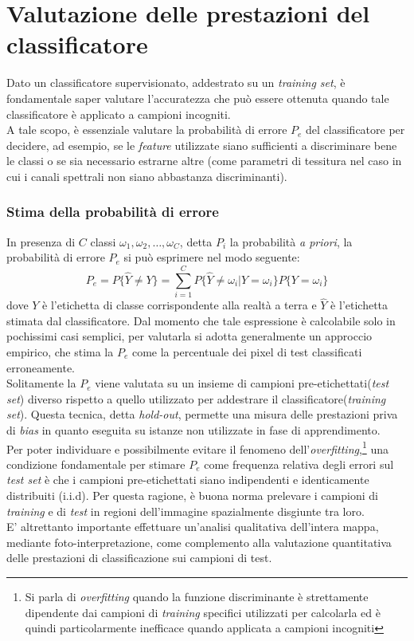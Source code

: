 
\chapter{Valutazione delle prestazioni del classificatore}
\label{cap:prestazioni}

Dato un classificatore supervisionato, addestrato su un \emph{training set}, è fondamentale saper valutare l'accuratezza che può essere ottenuta quando tale classificatore è applicato a campioni incogniti.\\
A tale scopo, è essenziale valutare la probabilità di errore $P_e$ del classificatore per decidere, ad esempio, se le \emph{feature} utilizzate siano sufficienti a discriminare bene le classi o se sia necessario estrarne altre (come parametri di tessitura nel caso in cui i canali spettrali non siano abbastanza discriminanti).
\clearpage

\subsection{Stima della probabilità di errore}
In presenza di $C$ classi $\omega_1,\omega_2, \ldots, \omega_C$, detta $P_i$ la probabilità \emph{a priori}, la probabilità di errore $P_e$ si può esprimere nel modo seguente:
\begin{equation}
\label{eq:P_e}
P_e = P\lbrace\widehat{Y}\neq Y\rbrace= {\sum_{i=1}^C P\lbrace\widehat{Y}\neq \omega_i\vert Y = \omega_i\rbrace}P\lbrace Y =\omega_i\rbrace
\end{equation}
dove $Y$ è l'etichetta di classe corrispondente alla realtà a terra e $\hat{Y}$ è l'etichetta stimata dal classificatore.
Dal momento che tale espressione è calcolabile solo in pochissimi casi semplici, per valutarla si adotta generalmente un approccio empirico, che stima la $P_e$ come la percentuale dei pixel di test classificati erroneamente.\\
Solitamente la $P_e$ viene valutata su un insieme di campioni pre-etichettati(\emph{test set}) diverso rispetto a quello utilizzato per addestrare il classificatore(\emph{training set}). Questa tecnica, detta \emph{hold-out}, permette una misura delle prestazioni priva di \emph{bias} in quanto eseguita su istanze non utilizzate in fase di apprendimento.\\
Per poter individuare e possibilmente evitare il fenomeno dell'\emph{overfitting},\footnote{Si parla di \emph{overfitting} quando la funzione discriminante è strettamente dipendente dai campioni di \emph{training} specifici utilizzati per calcolarla ed è quindi particolarmente inefficace quando applicata a campioni incogniti} una condizione fondamentale per stimare $P_e$ come frequenza relativa degli errori sul \emph{test set} è che i campioni pre-etichettati siano indipendenti e identicamente distribuiti (i.i.d). Per questa ragione, è buona norma prelevare i campioni di \emph{training} e di \emph{test} in regioni dell'immagine spazialmente disgiunte tra loro.\\
E' altrettanto importante effettuare un'analisi qualitativa dell'intera mappa, mediante foto-interpretazione, come complemento alla valutazione quantitativa delle prestazioni di classificazione sui campioni di test.

